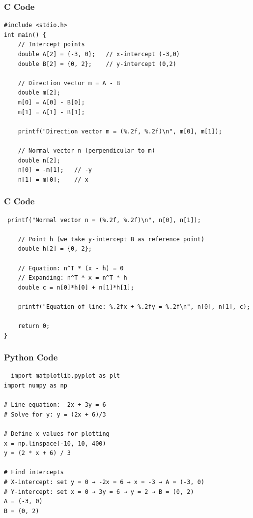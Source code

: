 \documentclass{beamer}
\begin{document}
\begin{frame}[fragile]
    \frametitle{C Code}
    \begin{lstlisting}
#include <stdio.h>
int main() {
    // Intercept points
    double A[2] = {-3, 0};   // x-intercept (-3,0)
    double B[2] = {0, 2};    // y-intercept (0,2)

    // Direction vector m = A - B
    double m[2];
    m[0] = A[0] - B[0];
    m[1] = A[1] - B[1];

    printf("Direction vector m = (%.2f, %.2f)\n", m[0], m[1]);

    // Normal vector n (perpendicular to m)
    double n[2];
    n[0] = -m[1];   // -y
    n[1] = m[0];    // x
\end{lstlisting}
\end{frame}
\begin{frame}[fragile]
    \frametitle{C Code }
    \begin{lstlisting}
 printf("Normal vector n = (%.2f, %.2f)\n", n[0], n[1]);

    // Point h (we take y-intercept B as reference point)
    double h[2] = {0, 2};

    // Equation: n^T * (x - h) = 0
    // Expanding: n^T * x = n^T * h
    double c = n[0]*h[0] + n[1]*h[1];

    printf("Equation of line: %.2fx + %.2fy = %.2f\n", n[0], n[1], c);

    return 0;
}
\end{lstlisting}
\end{frame}

 

\begin{frame}[fragile]
\frametitle{Python Code}
\begin{lstlisting}
  import matplotlib.pyplot as plt
import numpy as np

# Line equation: -2x + 3y = 6
# Solve for y: y = (2x + 6)/3

# Define x values for plotting
x = np.linspace(-10, 10, 400)
y = (2 * x + 6) / 3

# Find intercepts
# X-intercept: set y = 0 → -2x = 6 → x = -3 → A = (-3, 0)
# Y-intercept: set x = 0 → 3y = 6 → y = 2 → B = (0, 2)
A = (-3, 0)
B = (0, 2)
\end{lstlisting}
\end{frame}
\end{document}

